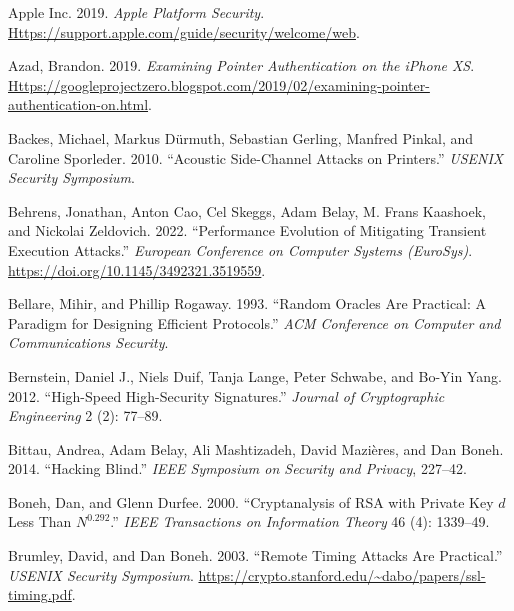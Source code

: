 \documentclass[
  letterpaper,
]{scrbook}
\newlength{\cslhangindent}
\newenvironment{CSLReferences}[2] %
 {\begin{list}{}{%
  \setlength{\itemindent}{0pt}
  \setlength{\leftmargin}{0pt}
  \setlength{\parsep}{0pt}
  \ifodd #1
   \setlength{\leftmargin}{\cslhangindent}
   \setlength{\itemindent}{-1\cslhangindent}
  \fi
  \setlength{\itemsep}{#2\baselineskip}}}
 {\end{list}}
\theoremstyle{definition}
\theoremstyle{plain}
\theoremstyle{plain}
\theoremstyle{remark}
\begin{document}
\protect{}\label{refs}
\begin{CSLReferences}{1}{1}
Apple Inc. 2019. \emph{{Apple} Platform Security}.
\href{https://support.apple.com/guide/security/welcome/web}{Https://support.apple.com/guide/security/welcome/web}.

Azad, Brandon. 2019. \emph{Examining Pointer Authentication on the
{iPhone XS}}.
\href{https://googleprojectzero.blogspot.com/2019/02/examining-pointer-authentication-on.html}{Https://googleprojectzero.blogspot.com/2019/02/examining-pointer-authentication-on.html}.

Backes, Michael, Markus Dürmuth, Sebastian Gerling, Manfred Pinkal, and
Caroline Sporleder. 2010. {``Acoustic Side-Channel Attacks on
Printers.''} \emph{USENIX Security Symposium}.

Behrens, Jonathan, Anton Cao, Cel Skeggs, Adam Belay, M. Frans Kaashoek,
and Nickolai Zeldovich. 2022. {``Performance Evolution of Mitigating
Transient Execution Attacks.''} \emph{European Conference on Computer
Systems (EuroSys)}. \url{https://doi.org/10.1145/3492321.3519559}.

Bellare, Mihir, and Phillip Rogaway. 1993. {``Random Oracles Are
Practical: A Paradigm for Designing Efficient Protocols.''} \emph{ACM
Conference on Computer and Communications Security}.

Bernstein, Daniel J., Niels Duif, Tanja Lange, Peter Schwabe, and Bo-Yin
Yang. 2012. {``High-Speed High-Security Signatures.''} \emph{Journal of
Cryptographic Engineering} 2 (2): 77--89.

Bittau, Andrea, Adam Belay, Ali Mashtizadeh, David Mazières, and Dan
Boneh. 2014. {``Hacking Blind.''} \emph{IEEE Symposium on Security and
Privacy}, 227--42.

Boneh, Dan, and Glenn Durfee. 2000. {``Cryptanalysis of {RSA} with
Private Key \(d\) Less Than \(N^{0.292}\).''} \emph{IEEE Transactions on
Information Theory} 46 (4): 1339--49.

Brumley, David, and Dan Boneh. 2003. {``Remote Timing Attacks Are
Practical.''} \emph{USENIX Security Symposium}.
\url{https://crypto.stanford.edu/~dabo/papers/ssl-timing.pdf}.


\end{CSLReferences}
\end{document}
